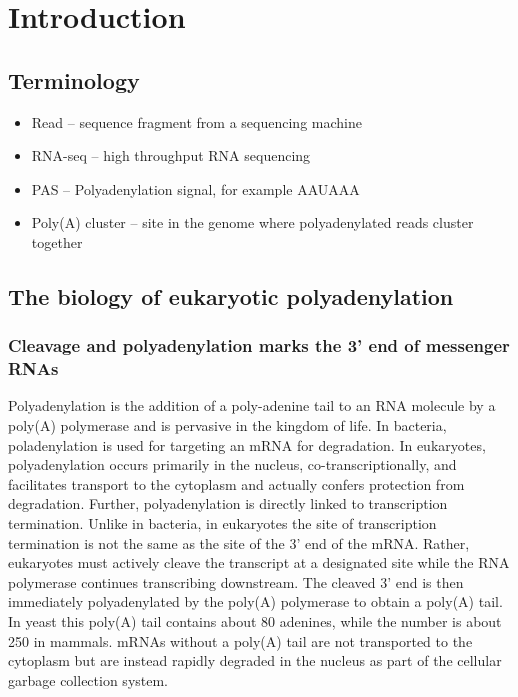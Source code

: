 %


\section{Introduction}

\subsection{Terminology}
\begin{itemize}
	\item Read -- sequence fragment from a sequencing machine
	\item RNA-seq -- high throughput RNA sequencing
	\item PAS -- Polyadenylation signal, for example AAUAAA
	\item Poly(A) cluster -- site in the genome where polyadenylated reads
		cluster together
\end{itemize}

\subsection{The biology of eukaryotic polyadenylation}

\subsubsection{Cleavage and polyadenylation marks the 3' end of messenger RNAs}
Polyadenylation is the addition of a poly-adenine tail to an RNA molecule by a
poly(A) polymerase and is pervasive in the kingdom of life. In bacteria,
poladenylation is used for targeting an mRNA for degradation. In eukaryotes,
polyadenylation occurs primarily in the nucleus, co-transcriptionally, and
facilitates transport to the cytoplasm and actually confers protection from
degradation. Further, polyadenylation is directly linked to transcription
termination. Unlike in bacteria, in eukaryotes the site of transcription
termination is not the same as the site of the 3' end of the mRNA. Rather,
eukaryotes must actively cleave the transcript at a designated site while the
RNA polymerase continues transcribing downstream. The cleaved 3' end is then
immediately polyadenylated by the poly(A) polymerase to obtain a poly(A) tail.
In yeast this poly(A) tail contains about 80 adenines, while the number is
about 250 in mammals. mRNAs without a poly(A) tail are not transported to the
cytoplasm but are instead rapidly degraded in the nucleus as part of the
cellular garbage collection system.

